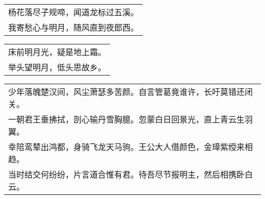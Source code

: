\nopagebreak%
\nopagebreak%
\noindent\begin{minipage}{\linewidth}
  \vskip-3pt\begin{table}[H]
    \centering
    \begin{tabular}{@{}l@{}}
杨花落尽子规啼，闻道龙标过五溪。\\
我寄愁心与明月，随风直到夜郎西。
    \end{tabular}
  \end{table}
\end{minipage}
\vspace{1cm}


\nopagebreak%
\nopagebreak%
\noindent\begin{minipage}{\linewidth}
  \vskip-3pt\begin{table}[H]
    \centering
    \begin{tabular}{@{}l@{}}
床前明月光，疑是地上霜。\\
举头望明月，低头思故乡。
    \end{tabular}
  \end{table}
\end{minipage}
\vspace{1cm}


\nopagebreak%
\nopagebreak%
\noindent\begin{minipage}{\linewidth}
  \vskip-3pt\begin{table}[H]
    \centering
    \begin{tabular}{@{}l@{}}
少年落魄楚汉间，风尘萧瑟多苦颜。自言管葛竟谁许，长吁莫错还闭关。\\
一朝君王垂拂拭，剖心输丹雪胸臆。忽蒙白日回景光，直上青云生羽翼。\\
幸陪鸾辇出鸿都，身骑飞龙天马驹。王公大人借颜色，金璋紫绶来相趋。\\
当时结交何纷纷，片言道合惟有君。待吾尽节报明主，然后相携卧白云。
    \end{tabular}
  \end{table}
\end{minipage}
\vspace{1cm}


